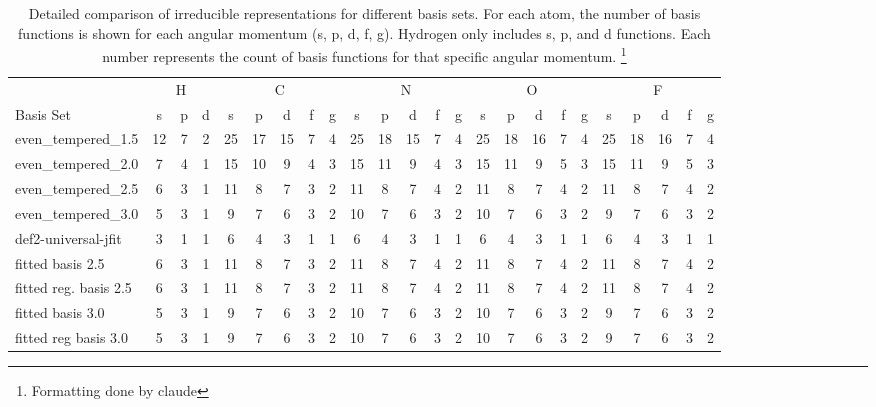 \begin{table}
\centering
\tiny
\begin{tabular}{|l|ccc|ccccc|ccccc|ccccc|ccccc|}
\hline
& \multicolumn{3}{c|}{H} & \multicolumn{5}{c|}{C} & \multicolumn{5}{c|}{N} & \multicolumn{5}{c|}{O} & \multicolumn{5}{c|}{F} \\
Basis Set & s & p & d & s & p & d & f & g & s & p & d & f & g & s & p & d & f & g & s & p & d & f & g \\
\hline
even\_tempered\_1.5 & 12 & 7 & 2 & 25 & 17 & 15 & 7 & 4 & 25 & 18 & 15 & 7 & 4 & 25 & 18 & 16 & 7 & 4 & 25 & 18 & 16 & 7 & 4 \\
even\_tempered\_2.0 & 7 & 4 & 1 & 15 & 10 & 9 & 4 & 3 & 15 & 11 & 9 & 4 & 3 & 15 & 11 & 9 & 5 & 3 & 15 & 11 & 9 & 5 & 3 \\
even\_tempered\_2.5 & 6 & 3 & 1 & 11 & 8 & 7 & 3 & 2 & 11 & 8 & 7 & 4 & 2 & 11 & 8 & 7 & 4 & 2 & 11 & 8 & 7 & 4 & 2 \\
even\_tempered\_3.0 & 5 & 3 & 1 & 9 & 7 & 6 & 3 & 2 & 10 & 7 & 6 & 3 & 2 & 10 & 7 & 6 & 3 & 2 & 9 & 7 & 6 & 3 & 2 \\
def2-universal-jfit & 3 & 1 & 1 & 6 & 4 & 3 & 1 & 1 & 6 & 4 & 3 & 1 & 1 & 6 & 4 & 3 & 1 & 1 & 6 & 4 & 3 & 1 & 1 \\
fitted basis 2.5 & 6 & 3 & 1 & 11 & 8 & 7 & 3 & 2 & 11 & 8 & 7 & 4 & 2 & 11 & 8 & 7 & 4 & 2 & 11 & 8 & 7 & 4 & 2 \\
fitted reg. basis 2.5 & 6 & 3 & 1 & 11 & 8 & 7 & 3 & 2 & 11 & 8 & 7 & 4 & 2 & 11 & 8 & 7 & 4 & 2 & 11 & 8 & 7 & 4 & 2 \\
fitted basis 3.0 & 5 & 3 & 1 & 9 & 7 & 6 & 3 & 2 & 10 & 7 & 6 & 3 & 2 & 10 & 7 & 6 & 3 & 2 & 9 & 7 & 6 & 3 & 2 \\
fitted reg basis 3.0 & 5 & 3 & 1 & 9 & 7 & 6 & 3 & 2 & 10 & 7 & 6 & 3 & 2 & 10 & 7 & 6 & 3 & 2 & 9 & 7 & 6 & 3 & 2 \\
\hline
\end{tabular}
\caption{Detailed comparison of irreducible representations for different basis sets. For each atom, the number of basis functions is shown for each angular momentum (s, p, d, f, g). Hydrogen only includes s, p, and d functions. Each number represents the count of basis functions for that specific angular momentum. \footnote{Formatting done by claude}}
\label{tab:basis-comparison-detailed}
\end{table}

